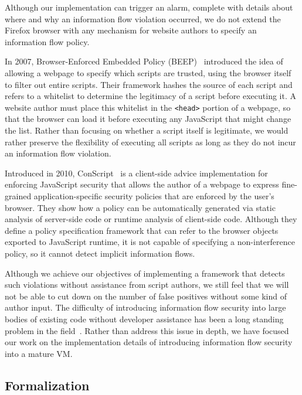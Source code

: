 Although our implementation can trigger an alarm, complete with details about where and why an information flow violation occurred, we do not extend the Firefox browser with any mechanism for website authors to specify an information flow policy.

In 2007, Browser-Enforced Embedded Policy (BEEP)~\cite{beep} introduced the idea of allowing a webpage to specify which scripts are trusted, using the browser itself to filter out entire scripts.
Their framework hashes the source of each script and refers to a whitelist to determine the legitimacy of a script before executing it.
A website author must place this whitelist in the \texttt{<head>} portion of a webpage, so that the browser can load it before executing any JavaScript that might change the list.
Rather than focusing on whether a script itself is legitimate, we would rather preserve the flexibility of executing all scripts as long as they do not incur an information flow violation.

Introduced in 2010, ConScript~\cite{5504806} is a client-side advice implementation for enforcing JavaScript security that allows the author of a webpage to express fine-grained application-specific security policies that are enforced by the user's browser.
They show how a policy can be automatically generated via static analysis of server-side code or runtime analysis of client-side code.
Although they define a policy specification framework that can refer to the browser objects exported to JavaScript runtime, it is not capable of specifying a non-interference policy, so it cannot detect implicit information flows.

Although we achieve our objectives of implementing a framework that detects such violations without assistance from script authors,  we still feel that we will not be able to cut down on the number of false positives without some kind of author input.
The difficulty of introducing information flow security into large bodies of existing code without developer assistance has been a long standing problem in the field~\cite{1159651}.
Rather than address this issue in depth, we have focused our work on the implementation details of introducing information flow security into a mature VM.

\subsection{Formalization}

